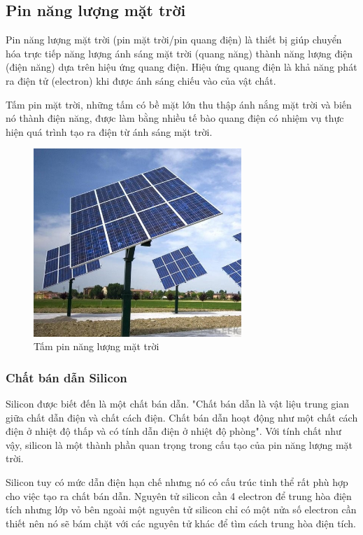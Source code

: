 \subsection{Pin năng lượng mặt trời}
Pin năng lượng mặt trời (pin mặt trời/pin quang điện) là thiết bị giúp chuyển hóa trực tiếp năng lượng ánh sáng mặt trời (quang năng) thành năng lượng điện (điện năng) dựa trên hiệu ứng quang điện. Hiệu ứng quang điện là khả năng phát ra điện tử (electron) khi được ánh sáng chiếu vào của vật chất.

Tấm pin mặt trời, những tấm có bề mặt lớn thu thập ánh nắng mặt trời và biến nó thành điện năng, được làm bằng nhiều tế bào quang điện có nhiệm vụ thực hiện quá trình tạo ra điện từ ánh sáng mặt trời.
\begin{figure}[H]
	\centering    
	\includegraphics[width=0.7\textwidth]{solarpanel}
	\caption[Tấm pin năng lượng mặt trời]{Tấm pin năng lượng mặt trời}
	\label{fig:solarpanel}
\end{figure}

\subsubsection*{Chất bán dẫn Silicon}
Silicon được biết đến là một chất bán dẫn. "Chất bán dẫn là vật liệu trung gian giữa chất dẫn điện và chất cách điện. Chất bán dẫn hoạt động như một chất cách điện ở nhiệt độ thấp và có tính dẫn điện ở nhiệt độ phòng". Với tính chất như vậy, silicon là một thành phần quan trọng trong cấu tạo của pin năng lượng mặt trời.

Silicon tuy có mức dẫn điện hạn chế nhưng nó có cấu trúc tinh thể rất phù hợp cho việc tạo ra chất bán dẫn. Nguyên tử silicon cần 4 electron để trung hòa điện tích nhưng lớp vỏ bên ngoài một nguyên tử silicon chỉ có một nửa số electron cần thiết nên nó sẽ bám chặt với các nguyên tử khác để tìm cách trung hòa điện tích.

